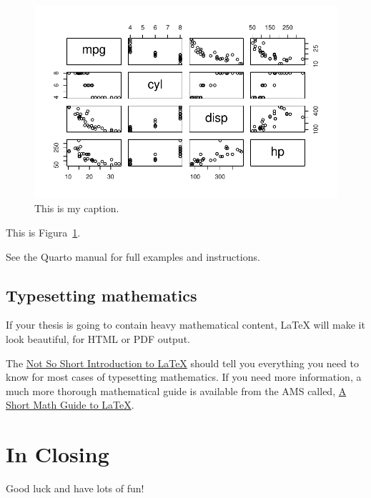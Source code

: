 \documentclass[
  letterpaper,
  12pt,
  oneside,
  spanish,
  doublespacing,
  headsepline,
  parskip]{MastersDoctoralThesis}
\begin{document}
\begin{figure}

\caption{\label{fig-cars}This is my caption.}

{\centering \includegraphics{./index_files/figure-pdf/fig-cars-1.pdf}

}

\end{figure}

This is Figura~\ref{fig-cars}.

See the Quarto manual for full examples and instructions.

\hypertarget{typesetting-mathematics}{%
\subsection{Typesetting mathematics}\label{typesetting-mathematics}}

If your thesis is going to contain heavy mathematical content, \LaTeX{}
will make it look beautiful, for HTML or PDF output.

The
\href{http://www.ctan.org/tex-archive/info/lshort/english/lshort.pdf}{Not
So Short Introduction to LaTeX} should tell you everything you need to
know for most cases of typesetting mathematics. If you need more
information, a much more thorough mathematical guide is available from
the AMS called,
\href{http://tug.ctan.org/info/short-math-guide/short-math-guide.pdf}{A
Short Math Guide to LaTeX}.

\hypertarget{in-closing}{%
\section{In Closing}\label{in-closing}}

Good luck and have lots of fun!
\end{document}
